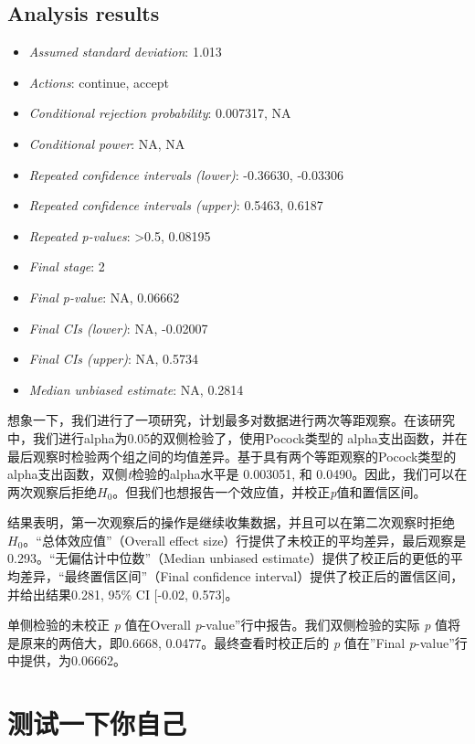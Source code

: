\documentclass[
  letterpaper,
  DIV=11,
  numbers=noendperiod]{scrreprt}
\providecommand{\tightlist}{%
  \setlength{\itemsep}{0pt}\setlength{\parskip}{0pt}}\usepackage{longtable,booktabs,array}
\begin{document}
\hypertarget{analysis-results}{%
\subsection{Analysis results}\label{analysis-results}}

\begin{itemize}
\tightlist
\item
  \emph{Assumed standard deviation}: 1.013
\item
  \emph{Actions}: continue, accept
\item
  \emph{Conditional rejection probability}: 0.007317, NA
\item
  \emph{Conditional power}: NA, NA
\item
  \emph{Repeated confidence intervals (lower)}: -0.36630, -0.03306
\item
  \emph{Repeated confidence intervals (upper)}: 0.5463, 0.6187
\item
  \emph{Repeated p-values}: \textgreater0.5, 0.08195
\item
  \emph{Final stage}: 2
\item
  \emph{Final p-value}: NA, 0.06662
\item
  \emph{Final CIs (lower)}: NA, -0.02007
\item
  \emph{Final CIs (upper)}: NA, 0.5734
\item
  \emph{Median unbiased estimate}: NA, 0.2814
\end{itemize}

想象一下，我们进行了一项研究，计划最多对数据进行两次等距观察。在该研究中，我们进行alpha为0.05的双侧检验了，使用Pocock类型的
alpha支出函数，并在最后观察时检验两个组之间的均值差异。基于具有两个等距观察的Pocock类型的alpha支出函数，双侧\emph{t}检验的alpha水平是
0.003051, 和
0.0490。因此，我们可以在两次观察后拒绝\(H_0\)。但我们也想报告一个效应值，并校正\emph{p}值和置信区间。

结果表明，第一次观察后的操作是继续收集数据，并且可以在第二次观察时拒绝\(H_0\)。``总体效应值''（Overall
effect
size）行提供了未校正的平均差异，最后观察是0.293。``无偏估计中位数''（Median
unbiased estimate）提供了校正后的更低的平均差异，``最终置信区间''（Final
confidence interval）提供了校正后的置信区间，并给出结果0.281, 95\% CI
{[}-0.02, 0.573{]}。

单侧检验的未校正 \emph{p} 值在Overall
\emph{p}-value''行中报告。我们双侧检验的实际 \emph{p}
值将是原来的两倍大，即0.6668, 0.0477。最终查看时校正后的 \emph{p}
值在''Final \emph{p}-value''行中提供，为0.06662。

\hypertarget{ux6d4bux8bd5ux4e00ux4e0bux4f60ux81eaux5df1}{%
\section{测试一下你自己}\label{ux6d4bux8bd5ux4e00ux4e0bux4f60ux81eaux5df1}}
\end{document}
